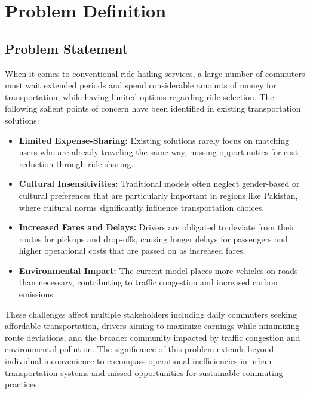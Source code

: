 
\chapter{Problem Definition}


\section{Problem Statement}

When it comes to conventional ride-hailing services, a large number of commuters must wait extended periods and spend considerable amounts of money for transportation, while having limited options regarding ride selection. The following salient points of concern have been identified in existing transportation solutions:

\begin{itemize}
    \item \textbf{Limited Expense-Sharing:} Existing solutions rarely focus on matching users who are already traveling the same way, missing opportunities for cost reduction through ride-sharing.
    
    \item \textbf{Cultural Insensitivities:} Traditional models often neglect gender-based or cultural preferences that are particularly important in regions like Pakistan, where cultural norms significantly influence transportation choices.
    
    \item \textbf{Increased Fares and Delays:} Drivers are obligated to deviate from their routes for pickups and drop-offs, causing longer delays for passengers and higher operational costs that are passed on as increased fares.
    
    \item \textbf{Environmental Impact:} The current model places more vehicles on roads than necessary, contributing to traffic congestion and increased carbon emissions.
\end{itemize}

These challenges affect multiple stakeholders including daily commuters seeking affordable transportation, drivers aiming to maximize earnings while minimizing route deviations, and the broader community impacted by traffic congestion and environmental pollution. The significance of this problem extends beyond individual inconvenience to encompass operational inefficiencies in urban transportation systems and missed opportunities for sustainable commuting practices.

